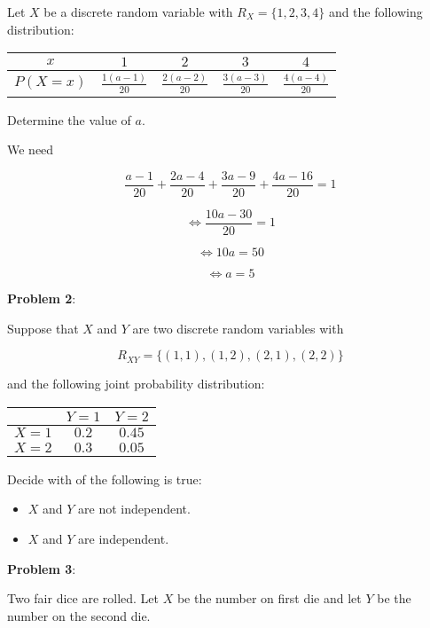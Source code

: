 \documentclass{article}
\begin{document}
Let $X$ be a discrete random variable with $R_X=\{1,2,3,4\}$ and the following distribution:

\begin{center}
    \begin{tabular}{|c|c|c|c|c|}
        \hline
        $x$&$1$&$2$&$3$&$4$\\
        \hline
        $P(X=x)$&$\frac{1(a-1)}{20}$&$\frac{2(a-2)}{20}$&$\frac{3(a-3)}{20}$&$\frac{4(a-4)}{20}$\\
        \hline
    \end{tabular}
\end{center}

Determine the value of $a$.

{\color{blue}

We need 

\[\frac{a-1}{20}+\frac{2a-4}{20}+\frac{3a-9}{20}+\frac{4a-16}{20}=1\]

\[\Leftrightarrow\frac{10a-30}{20}=1\]

\[\Leftrightarrow10a=50\]

\[\Leftrightarrow a=5\]

}

\noindent\textbf{Problem 2}:

Suppose that $X$ and $Y$ are two discrete random variables with

\[R_{XY}=\{(1,1),(1,2),(2,1),(2,2)\}\]

and the following joint probability distribution:

\begin{center}
    \begin{tabular}{|c|c|c|}
        \hline
        &$Y=1$&$Y=2$\\
        \hline
        $X=1$&$0.2$&$0.45$\\
        \hline
        $X=2$&$0.3$&$0.05$\\
        \hline
    \end{tabular}
\end{center}

Decide with of the following is true:

\begin{itemize}
    \item {\color{blue}$X$ and $Y$ are not independent.}
    \item $X$ and $Y$ are independent.
\end{itemize}

\noindent\textbf{Problem 3}:

Two fair dice are rolled. Let $X$ be the number on first die and let $Y$ be the number on the second die.
\end{document}
